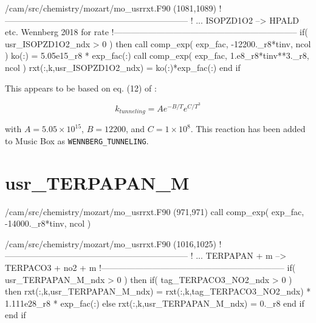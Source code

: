 \documentclass[titlepage]{article}
\begin{document}
\begin{blockcode}[commandchars=\\\{\}]
\color{gray}/cam/src/chemistry/mozart/mo_usrrxt.F90 (1081,1089)
!-----------------------------------------------------------------
!       ... ISOPZD1O2 --> HPALD etc. Wennberg 2018 for rate
!-----------------------------------------------------------------
       if( usr_ISOPZD1O2_ndx > 0 ) then
          call comp_exp( exp_fac, -12200._r8*tinv, ncol )
          ko(:) = 5.05e15_r8 * exp_fac(:)
          call comp_exp( exp_fac, 1.e8_r8*tinv**3._r8, ncol )
          rxt(:,k,usr_ISOPZD1O2_ndx) = ko(:)*exp_fac(:)
       end if
\end{blockcode}

This appears to be based on eq. (12) of \cite{Wennberg2018}:

\begin{equation}
k_{tunneling} = A e^{-B/T} e^{C/T^3}
\end{equation}

\noindent with $A = 5.05 \times 10^{15}$, $B = 12200$, and $C = 1 \times 10^8$. This reaction has been added to Music Box as \verb>WENNBERG_TUNNELING>.


\section{usr\_TERPAPAN\_M}

\begin{blockcode}[commandchars=\\\{\}]
\color{gray}/cam/src/chemistry/mozart/mo_usrrxt.F90 (971,971)
       call comp_exp( exp_fac, -14000._r8*tinv, ncol )
\end{blockcode}

\begin{blockcode}[commandchars=\\\{\}]
\color{gray}/cam/src/chemistry/mozart/mo_usrrxt.F90 (1016,1025)
!-----------------------------------------------------------------
!       ... TERPAPAN + m --> TERPACO3 + no2 + m
!-----------------------------------------------------------------
       if( usr_TERPAPAN_M_ndx > 0 ) then
          if( tag_TERPACO3_NO2_ndx > 0 ) then
             rxt(:,k,usr_TERPAPAN_M_ndx) = rxt(:,k,tag_TERPACO3_NO2_ndx) * 1.111e28_r8 * exp_fac(:)
          else
             rxt(:,k,usr_TERPAPAN_M_ndx) = 0._r8
          end if
       end if
\end{blockcode}
\end{document}

